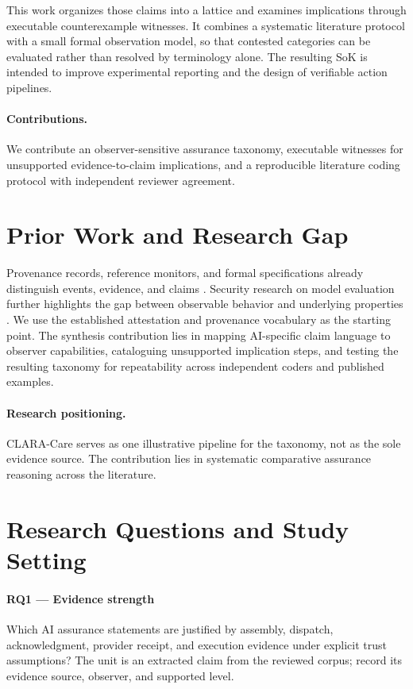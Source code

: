 \documentclass[11pt,a4paper]{article}
\begin{document}
This work organizes those claims into a lattice and examines implications through executable counterexample witnesses. It combines a systematic literature protocol with a small formal observation model, so that contested categories can be evaluated rather than resolved by terminology alone. The resulting SoK is intended to improve experimental reporting and the design of verifiable action pipelines.

\paragraph{Contributions.} We contribute an observer-sensitive assurance taxonomy, executable witnesses for unsupported evidence-to-claim implications, and a reproducible literature coding protocol with independent reviewer agreement.

\section{Prior Work and Research Gap}
Provenance records, reference monitors, and formal specifications already distinguish events, evidence, and claims \cite{saltzer1975,lamport2002,fhir2023}. Security research on model evaluation further highlights the gap between observable behavior and underlying properties \cite{sculley2015}. We use the established attestation and provenance vocabulary as the starting point. The synthesis contribution lies in mapping AI-specific claim language to observer capabilities, cataloguing unsupported implication steps, and testing the resulting taxonomy for repeatability across independent coders and published examples.

\paragraph{Research positioning.} CLARA-Care serves as one illustrative pipeline for the taxonomy, not as the sole evidence source. The contribution lies in systematic comparative assurance reasoning across the literature.

\section{Research Questions and Study Setting}
\paragraph{RQ1 — Evidence strength} Which AI assurance statements are justified by assembly, dispatch, acknowledgment, provider receipt, and execution evidence under explicit trust assumptions? The unit is an extracted claim from the reviewed corpus; record its evidence source, observer, and supported level.
\end{document}
